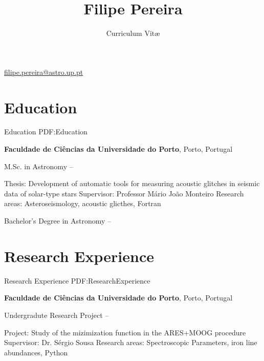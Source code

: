 \documentclass[letterpaper,10pt,oneside]{article}
\newcommand{\CVAuthor}{Filipe Pereira}
\newcommand{\CVTitle}{Curriculum Vit\ae}
\newcommand{\CVWebpage}{http://www.example.com/johndoe}
\begin{document}

\title{\CVAuthor}
\subtitle{\CVTitle}

\begin{subtitle}
\par
\href{mailto:filipe.pereira@astro.up.pt}
{filipe.pereira@astro.up.pt}
\end{subtitle}

\begin{body}


\section
{Education}
{Education}
{PDF:Education}

{\textbf{Faculdade de Ciências da Universidade do Porto}},
Porto, Portugal

\GapNoBreak
\BulletItem
M.Sc. in Astronomy
\hfill
{} --
\begin{detail}
\SubBulletItem
Thesis: Development of automatic tools for measuring acoustic glitches in seismic data of solar-type stars
\SubBulletItem
Supervisor:
Professor Mário João Monteiro
\SubBulletItem
Research areas: Asteroseismology, acoustic glicthes, Fortran
\end{detail}

\GapNoBreak
\BulletItem
Bachelor's Degree in Astronomy
\hfill
{} --


\section
{Research Experience}
{Research Experience}
{PDF:ResearchExperience}

{\textbf{Faculdade de Ciências da Universidade do Porto}},
Porto, Portugal

\GapNoBreak
\BulletItem
Undergradute Research Project
\hfill
{} --
\begin{detail}
\SubBulletItem
Project:
Study of the mizimization function in the ARES+MOOG procedure
\SubBulletItem
Supervisor:
Dr. Sérgio Sousa
\SubBulletItem
Research areas: Spectroscopic Parameters, iron line abundances, Python
\end{detail}


\end{body}
\end{document}
